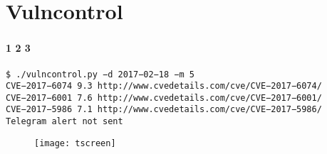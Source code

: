
\section{Vulncontrol}

\begin{frame}
\frametitle{\insertsection}
\framesubtitle{1 2 3}

{\scriptsize \texttt{\$ ./vulncontrol.py −d 2017−02−18 −m 5 \\
CVE−2017−6074 9.3 http://www.cvedetails.com/cve/CVE−2017−6074/ \\
CVE−2017−6001 7.6 http://www.cvedetails.com/cve/CVE−2017−6001/ \\
CVE−2017−5986 7.1 http://www.cvedetails.com/cve/CVE−2017−5986/ \\
Telegram alert not sent
}}

\begin{figure}[h]
    \center
    \texttt{[image: tscreen]}
\end{figure}
\end{frame}


\iffalse
максимум 10 слайдов
по 1 минуте на слайд
картинки, схемы, таблицы, примеры кода, списки, скриншоты

обзор источников
системный анализ
вариантный анализ
безопасность облачных вычислений
экспериментальные исследования
- крит. уязвимости
- эксплуатация dirty cow
- vulncontrol
анализ результатов

1. описать актуальность исследования
2. описать текущие проблемы в облаках
3. как эти проблемы решаются
4. какие проблемы не решаются
5. что я сделал для решения проблем
...
\fi
